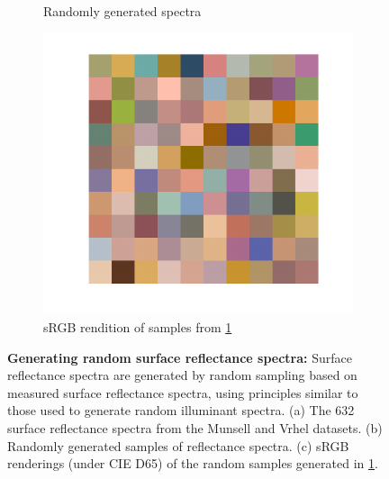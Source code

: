 \documentclass{jov}
\begin{document}
\begin{figure}
\begin{subfigure}[b]{0.3\textwidth}
        \caption{Randomly generated spectra}
        \label{fig:randomSurface}
    \end{subfigure}
    \begin{subfigure}[b]{0.3 \textwidth}
    \centering
        \includegraphics[width=\textwidth]{../Figures/Figure7/Figure7_c.pdf}
        \caption{sRGB rendition of samples from \ref{fig:randomSurface}}
        \label{fig:sRGBSurface}
    \end{subfigure}
    \caption{{\bf Generating random surface reflectance spectra:} Surface reflectance spectra are generated by random sampling based on measured surface reflectance spectra, using principles similar to those used to generate random illuminant spectra. (a) The 632 surface reflectance spectra from the Munsell and Vrhel datasets. (b) Randomly generated samples of reflectance spectra. (c) sRGB renderings (under CIE D65) of the random samples generated in \ref{fig:randomSurface}.}\label{fig:surfaceReflectanceGeneration}
\end{figure}
\end{document}

